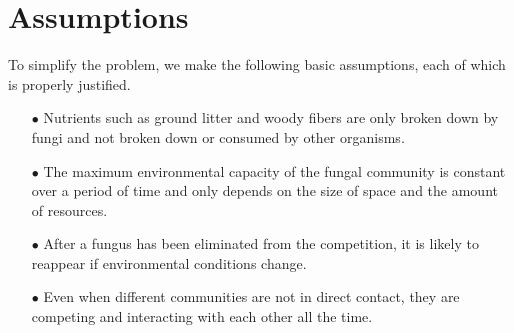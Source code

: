 \pagestyle{fancy}
\section{Assumptions}

To simplify the problem, we make the following basic assumptions, each of which is properly justified.

\begin{itemize}
    \item[$\bullet$] Nutrients such as ground litter and woody fibers are only broken down by fungi and not broken down or consumed by other organisms.
    \item[$\bullet$] The maximum environmental capacity of the fungal community is constant over a period of time and only depends on the size of space and the amount of resources.
    \item[$\bullet$] After a fungus has been eliminated from the competition, it is likely to reappear if environmental conditions change.
    \item[$\bullet$] Even when different communities are not in direct contact, they are competing and interacting with each other all the time.
\end{itemize}
    